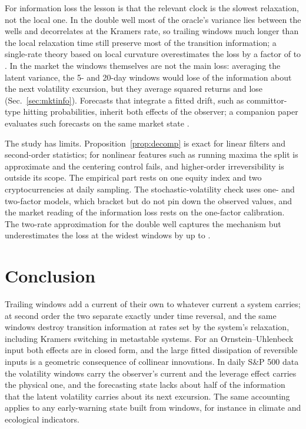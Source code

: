 For information loss the lesson is that the relevant clock is the slowest relaxation, not the local one. In the double well most of the oracle's variance lies between the wells and decorrelates at the Kramers rate, so trailing windows much longer than the local relaxation time still preserve most of the transition information; a single-rate theory based on local curvature overestimates the loss by a factor of \SingleFacLo to \SingleFacHi. In the market the windows themselves are not the main loss: averaging the latent variance, the 5- and 20-day windows would lose \EllMktPair of the information about the next volatility excursion, but they average squared returns and lose \EllMktRV (Sec.~\ref{sec:mktinfo}). Forecasts that integrate a fitted drift, such as committor-type hitting probabilities, inherit both effects of the observer; a companion paper evaluates such forecasts on the same market state \cite{xing2026b}.

The study has limits. Proposition~\ref{prop:decomp} is exact for linear filters and second-order statistics; for nonlinear features such as running maxima the split is approximate and the centering control fails, and higher-order irreversibility is outside its scope. The empirical part rests on one equity index and two cryptocurrencies at daily sampling. The stochastic-volatility check uses one- and two-factor models, which bracket but do not pin down the observed values, and the market reading of the information loss rests on the one-factor calibration. The two-rate approximation for the double well captures the mechanism but underestimates the loss at the widest windows by up to \TwoErrAbs.

\section{Conclusion}\label{sec:conclusion}

Trailing windows add a current of their own to whatever current a system carries; at second order the two separate exactly under time reversal, and the same windows destroy transition information at rates set by the system's relaxation, including Kramers switching in metastable systems. For an Ornstein--Uhlenbeck input both effects are in closed form, and the large fitted dissipation of reversible inputs is a geometric consequence of collinear innovations. In daily S\&P 500 data the volatility windows carry the observer's current and the leverage effect carries the physical one, and the forecasting state lacks about half of the information that the latent volatility carries about its next excursion. The same accounting applies to any early-warning state built from windows, for instance in climate and ecological indicators.
